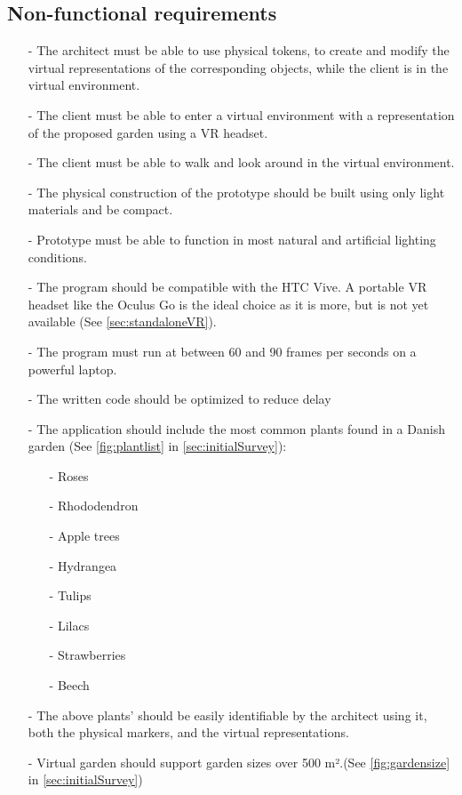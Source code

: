 				\subsection{Non-functional requirements}
					\begin{itemize}
						\item[-] The architect must be able to use physical tokens, to create and modify the virtual representations of the corresponding objects, while the client is in the virtual environment.
						\item[-] The client must be able to enter a virtual environment with a representation of the proposed garden using a VR headset.
						\item[-] The client must be able to walk and look around in the virtual environment.
						
						\item[-] The physical construction of the prototype should be built using only light materials and be compact.		
						\item[-] Prototype must be able to function in most natural and artificial lighting conditions.
						
						\item[-] The program should be compatible with the HTC Vive. A portable VR headset like the Oculus Go is the ideal choice as it is more, but is not yet available (See \autoref{sec:standaloneVR}).
						\item[-] The program must run at between 60 and 90 frames per seconds on a powerful laptop.
						\item[-] The written code should be optimized to reduce delay
						\item[-] The application should include the most common plants found in a Danish garden (See \autoref{fig:plantlist} in \autoref{sec:initialSurvey}):
						\begin{itemize}
							\item[-] Roses
							\item[-] Rhododendron
							\item[-] Apple trees
							\item[-] Hydrangea
							\item[-] Tulips
							\item[-] Lilacs
							\item[-] Strawberries
							\item[-] Beech
						\end{itemize}
						\item[-] The above plants' should be easily identifiable by the architect using it, both the physical markers, and the virtual representations.
						\item[-] Virtual garden should support garden sizes over 500 m².(See \autoref{fig:gardensize} in \autoref{sec:initialSurvey})
						

\end{itemize}
